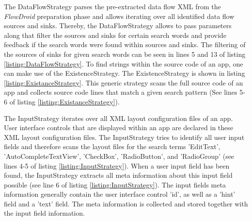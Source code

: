 The DataFlowStrategy parses the pre-extracted data flow \acs{XML} from the \textit{FlowDroid} preparation phase and allows iterating over all identified data flow sources and sinks.
Thereby, the DataFlowStrategy allows to pass parameters along that filter the sources and sinks for certain search words and provide feedback if the search words were found within sources and sinks.
The filtering of the sources of sinks for given search words can be seen in lines 5 and 13 of listing \ref{listing:DataFlowStrategy}.
To find strings within the source code of an app, one can make use of the ExistenceStrategy.
The ExistenceStrategy is shown in listing \ref{listing:ExistanceStrategy}.
This generic strategy scans the full source code of an app and collects source code lines that match a given search pattern (See lines 5-6 of listing \ref{listing:ExistanceStrategy}).
 

The InputStrategy iterates over all \acs{XML} layout configuration files of an app. 
User interface controls that are displayed within an app are declared in these \acs{XML} layout configuration files.
The InputStrategy tries to identify all user input fields and therefore scans the layout files for the search terms 'EditText', 'AutoCompleteTextView', 'CheckBox', 'RadioButton', and 'RadioGroup' (see lines 4-5 of listing \ref{listing:InputStrategy}).
When a user input field has been found, the InputStrategy extracts all meta information about this input field possible (see line 6 of listing \ref{listing:InputStrategy}).
The input fields meta information generally contain the user interface control 'id', as well as a 'hint' field and a 'text' field. 
The meta information is collected and stored together with the input field information.


